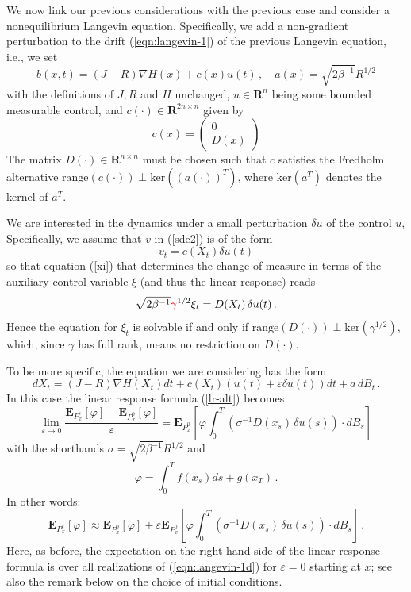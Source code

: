 \documentclass[]{tMPH2e}
\newcommand{\recheck}[1]{{\color{red} #1}}
\newcommand{\R}{{\mathbf R}}
\newcommand{\eps}{\varepsilon}
\newcommand{\bE}{{\mathbf E}}
\begin{document}
We now link our previous considerations with the previous case and consider a nonequilibrium Langevin equation. Specifically, we add a non-gradient perturbation to the drift (\ref{eqn:langevin-1}) of the previous Langevin equation, i.e., we set 
\begin{equation}\label{eqn:langevin-1b}
b(x,t) = (J-R)\nabla H(x) +  c(x) u(t)\,,\quad a(x) = \sqrt{2\beta^{-1}}R^{1/2}
\end{equation}
with the definitions of $J,R$ and $H$ unchanged, $u\in\R^{n}$ being some bounded measurable control, and $c(\cdot)\in\R^{2n\times n}$ given by 
\[
c(x) = \left( \begin{array}{c}
0 \\ D(x) \end{array}\right)
\]
The matrix $D(\cdot)\in\R^{n\times n}$ must be chosen such that $c$ satisfies the Fredholm alternative $\mathrm{range}(c(\cdot))\perp \mathrm{ker}((a(\cdot))^{T})$, where $\mathrm{ker}(a^T)$ denotes the kernel of $a^T$. 

We are interested in the dynamics under a small perturbation $\delta u$ of the control $u$, Specifically, we assume that $v$ in (\ref{sde2}) is of the form 
\begin{equation}\label{eqn:langevin-1c}
v_{t} = c(X_{t})\delta u(t)
\end{equation}
so that equation (\ref{xi}) that determines the change of measure in terms of the auxiliary control variable $\xi$ (and thus the linear response) reads 
\[
\sqrt{2\beta^{-1}}\recheck{\gamma}^{1/2} \xi_{t} = D(X_{t})\,\delta u(t)\,.
\]
\recheck{Hence the equation for $\xi_{t}$ is solvable if and only if $\mathrm{range}(D(\cdot))\perp \mathrm{ker}(\gamma^{1/2})$, which, since $\gamma$ has full rank, means no restriction on $D(\cdot)$.}

To be more specific, the equation we are considering has the form
\begin{equation}\label{eqn:langevin-1d}
dX_t =  (J-R)\nabla H(X_{t})dt + c(X_t)(u(t)+\eps \delta u(t))dt+a\, dB_t\,.
\end{equation}
In this case the linear response formula (\ref{lr-alt})  becomes
\begin{equation}\label{lr-alt2}
\lim_{\eps\to 0}\frac{\bE_{P_{x}^{\eps}}[\varphi] - \bE_{P_{x}^{0}}[\varphi]}{\eps} =  \bE_{P_{x}^{0}}\left[\varphi\int_{0}^{T}(\sigma^{-1}D(x_{s})\,\delta u(s))\cdot dB_{s} \right]\,
\end{equation}
with the shorthands $\sigma=\sqrt{2\beta^{-1}}R^{1/2}$ and 
\[
\varphi = \int_{0}^{T}f(x_{s})ds+g(x_{T})\,.
\]
In other words: 
\begin{equation}\label{eqn:neq-response}
\bE_{P_{x}^{\eps}}[\varphi] \approx \bE_{P_{x}^0}[\varphi] + \eps\bE_{P_{x}^0}\left[\varphi\int_{0}^{T}(\sigma^{-1}D(x_{s})\,\delta u(s))\cdot dB_{s} \right]\,.
\end{equation}
Here, as before, the expectation on the right hand side of the linear response formula is over all realizations of (\ref{eqn:langevin-1d}) for $\eps=0$ starting at $x$; see also the remark below on the choice of initial conditions. 
\end{document}

